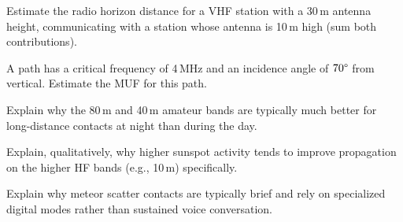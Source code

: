 \begin{practiceproblems}
\item Estimate the radio horizon distance for a VHF station with a
30\,m antenna height, communicating with a station whose antenna is
10\,m high (sum both contributions).
\item A path has a critical frequency of 4\,MHz and an incidence angle
of $70\degree$ from vertical. Estimate the MUF for this path.
\item Explain why the 80\,m and 40\,m amateur bands are typically much
better for long-distance contacts at night than during the day.
\item Explain, qualitatively, why higher sunspot activity tends to
improve propagation on the higher HF bands (e.g., 10\,m) specifically.
\item Explain why meteor scatter contacts are typically brief and rely
on specialized digital modes rather than sustained voice conversation.
\end{practiceproblems}
